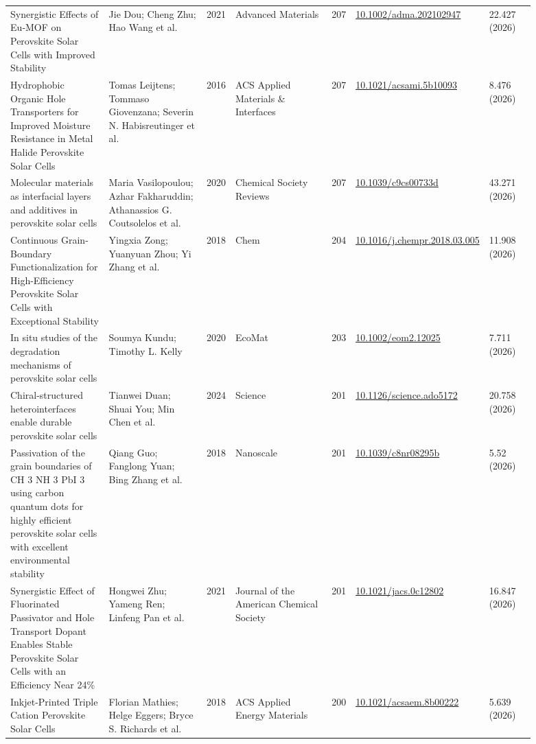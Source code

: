\documentclass[10pt,a4paper]{article}
\begin{document}
{\begin{longtable}{p{0.197\linewidth}p{0.197\linewidth}p{0.043\linewidth}p{0.197\linewidth}p{0.043\linewidth}p{0.117\linewidth}p{0.098\linewidth}}
Synergistic Effects of Eu‐MOF on Perovskite Solar Cells with Improved Stability & Jie Dou; Cheng Zhu; Hao Wang et al. & 2021 & Advanced Materials & 207 & \href{https://doi.org/10.1002/adma.202102947}{10.1002/adma.202102947} & 22.427 (2026) \\
Hydrophobic Organic Hole Transporters for Improved Moisture Resistance in Metal Halide Perovskite Solar Cells & Tomas Leijtens; Tommaso Giovenzana; Severin N. Habisreutinger et al. & 2016 & ACS Applied Materials \& Interfaces & 207 & \href{https://doi.org/10.1021/acsami.5b10093}{10.1021/acsami.5b10093} & 8.476 (2026) \\
Molecular materials as interfacial layers and additives in perovskite solar cells & Maria Vasilopoulou; Azhar Fakharuddin; Athanassios G. Coutsolelos et al. & 2020 & Chemical Society Reviews & 207 & \href{https://doi.org/10.1039/c9cs00733d}{10.1039/c9cs00733d} & 43.271 (2026) \\
Continuous Grain-Boundary Functionalization for High-Efficiency Perovskite Solar Cells with Exceptional Stability & Yingxia Zong; Yuanyuan Zhou; Yi Zhang et al. & 2018 & Chem & 204 & \href{https://doi.org/10.1016/j.chempr.2018.03.005}{10.1016/j.chempr.2018.03.005} & 11.908 (2026) \\
In situ studies of the degradation mechanisms of perovskite solar cells & Soumya Kundu; Timothy L. Kelly & 2020 & EcoMat & 203 & \href{https://doi.org/10.1002/eom2.12025}{10.1002/eom2.12025} & 7.711 (2026) \\
Chiral-structured heterointerfaces enable durable perovskite solar cells & Tianwei Duan; Shuai You; Min Chen et al. & 2024 & Science & 201 & \href{https://doi.org/10.1126/science.ado5172}{10.1126/science.ado5172} & 20.758 (2026) \\
Passivation of the grain boundaries of CH 3 NH 3 PbI 3 using carbon quantum dots for highly efficient perovskite solar cells with excellent environmental stability & Qiang Guo; Fanglong Yuan; Bing Zhang et al. & 2018 & Nanoscale & 201 & \href{https://doi.org/10.1039/c8nr08295b}{10.1039/c8nr08295b} & 5.52 (2026) \\
Synergistic Effect of Fluorinated Passivator and Hole Transport Dopant Enables Stable Perovskite Solar Cells with an Efficiency Near 24\% & Hongwei Zhu; Yameng Ren; Linfeng Pan et al. & 2021 & Journal of the American Chemical Society & 201 & \href{https://doi.org/10.1021/jacs.0c12802}{10.1021/jacs.0c12802} & 16.847 (2026) \\
Inkjet-Printed Triple Cation Perovskite Solar Cells & Florian Mathies; Helge Eggers; Bryce S. Richards et al. & 2018 & ACS Applied Energy Materials & 200 & \href{https://doi.org/10.1021/acsaem.8b00222}{10.1021/acsaem.8b00222} & 5.639 (2026) \\

\end{longtable}}
\end{document}
